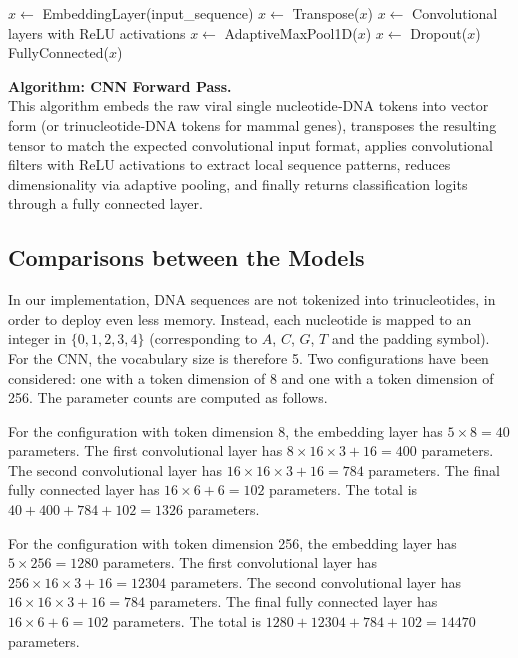 \documentclass{article}
\theoremstyle{remark}
\begin{document}
\begin{algorithm}[H]
\caption{CNN Forward Pass}
\begin{algorithmic}[1]
    \State $x \gets$ EmbeddingLayer(input\_sequence)
    \State $x \gets$ Transpose($x$) 
    \State $x \gets$ Convolutional layers with ReLU activations
    \State $x \gets$ AdaptiveMaxPool1D($x$)
    \State $x \gets$ Dropout($x$)
    \State \Return FullyConnected($x$)
\EndProcedure
\end{algorithmic}
\end{algorithm}

\noindent
\textbf{Algorithm: CNN Forward Pass.}\\
This algorithm embeds the raw viral single nucleotide‑DNA tokens into vector form (or trinucleotide‑DNA tokens for mammal genes), transposes the resulting tensor to match the expected convolutional input format, applies convolutional filters with ReLU activations to extract local sequence patterns, reduces dimensionality via adaptive pooling, and finally returns classification logits through a fully connected layer.

\vspace{1em}

\subsection{Comparisons between the Models}

In our implementation, DNA sequences are not tokenized into trinucleotides, in order to deploy even less memory. Instead, each nucleotide is mapped to an integer in \(\{0,1,2,3,4\}\) (corresponding to \(A\), \(C\), \(G\), \(T\) and the padding symbol). For the CNN, the vocabulary size is therefore 5. Two configurations have been considered: one with a token dimension of 8 and one with a token dimension of 256. The parameter counts are computed as follows.

For the configuration with token dimension 8, the embedding layer has \(5 \times 8 = 40\) parameters. The first convolutional layer has \(8 \times 16 \times 3 + 16 = 400\) parameters. The second convolutional layer has \(16 \times 16 \times 3 + 16 = 784\) parameters. The final fully connected layer has \(16 \times 6 + 6 = 102\) parameters. The total is \(40+400+784+102=1326\) parameters.

For the configuration with token dimension 256, the embedding layer has \(5 \times 256 = 1280\) parameters. The first convolutional layer has \(256 \times 16 \times 3 + 16 = 12304\) parameters. The second convolutional layer has \(16 \times 16 \times 3 + 16 = 784\) parameters. The final fully connected layer has \(16 \times 6 + 6 = 102\) parameters. The total is \(1280+12304+784+102=14470\) parameters.
\end{document}
